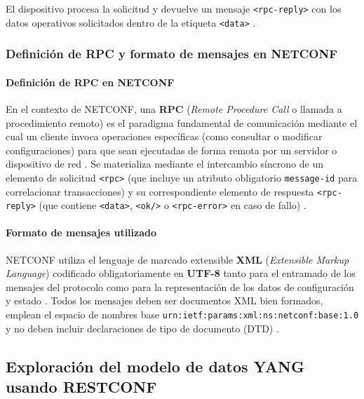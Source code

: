 \documentclass[12pt,a4paper]{article}
\begin{document}
El dispositivo procesa la solicitud y devuelve un mensaje \texttt{<rpc-reply>} con los datos operativos solicitados dentro de la etiqueta \texttt{<data>} \parencite{enns2011rfc6241}.

\subsubsection{Definición de RPC y formato de mensajes en NETCONF}

\paragraph{Definición de RPC en NETCONF}

En el contexto de NETCONF, una \textbf{RPC} (\textit{Remote Procedure Call} o llamada a procedimiento remoto) es el paradigma fundamental de comunicación mediante el cual un cliente invoca operaciones específicas (como consultar o modificar configuraciones) para que sean ejecutadas de forma remota por un servidor o dispositivo de red \parencite{enns2011rfc6241}. Se materializa mediante el intercambio síncrono de un elemento de solicitud \texttt{<rpc>} (que incluye un atributo obligatorio \texttt{message-id} para correlacionar transacciones) y su correspondiente elemento de respuesta \texttt{<rpc-reply>} (que contiene \texttt{<data>}, \texttt{<ok/>} o \texttt{<rpc-error>} en caso de fallo) \parencite{enns2011rfc6241}.

\paragraph{Formato de mensajes utilizado}

NETCONF utiliza el lenguaje de marcado extensible \textbf{XML} (\textit{Extensible Markup Language}) codificado obligatoriamente en \textbf{UTF-8} tanto para el entramado de los mensajes del protocolo como para la representación de los datos de configuración y estado \parencite{enns2011rfc6241}. Todos los mensajes deben ser documentos XML bien formados, emplean el espacio de nombres base \texttt{urn:ietf:params:xml:ns:netconf:base:1.0} y no deben incluir declaraciones de tipo de documento (DTD) \parencite{enns2011rfc6241}.





\subsection{Exploración del modelo de datos YANG usando RESTCONF}
\end{document}
